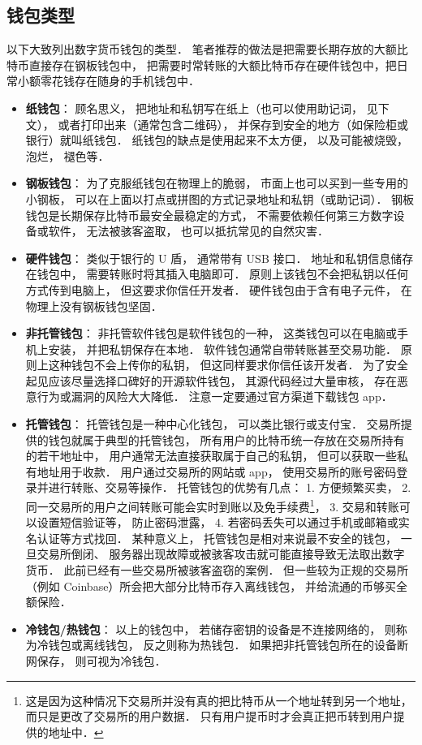 \subsection{钱包类型}
以下大致列出数字货币钱包的类型． 笔者推荐的做法是把需要长期存放的大额比特币直接存在钢板钱包中， 把需要时常转账的大额比特币存在硬件钱包中，把日常小额零花钱存在随身的手机钱包中．
\begin{itemize}
\item \textbf{纸钱包}： 顾名思义， 把地址和私钥写在纸上（也可以使用助记词， 见下文）， 或者打印出来（通常包含二维码）， 并保存到安全的地方（如保险柜或银行）就叫纸钱包． 纸钱包的缺点是使用起来不太方便， 以及可能被烧毁， 泡烂， 褪色等．
\item \textbf{钢板钱包}： 为了克服纸钱包在物理上的脆弱， 市面上也可以买到一些专用的小钢板， 可以在上面以打点或拼图的方式记录地址和私钥（或助记词）． 钢板钱包是长期保存比特币最安全最稳定的方式， 不需要依赖任何第三方数字设备或软件， 无法被骇客盗取， 也可以抵抗常见的自然灾害．
\item \textbf{硬件钱包}： 类似于银行的 U 盾， 通常带有 USB 接口． 地址和私钥信息储存在钱包中， 需要转账时将其插入电脑即可． 原则上该钱包不会把私钥以任何方式传到电脑上， 但这要求你信任开发者． 硬件钱包由于含有电子元件， 在物理上没有钢板钱包坚固．
\item \textbf{非托管钱包}： 非托管软件钱包是软件钱包的一种， 这类钱包可以在电脑或手机上安装， 并把私钥保存在本地． 软件钱包通常自带转账甚至交易功能． 原则上这种钱包不会上传你的私钥， 但这同样要求你信任该开发者． 为了安全起见应该尽量选择口碑好的开源软件钱包， 其源代码经过大量审核， 存在恶意行为或漏洞的风险大大降低． 注意一定要通过官方渠道下载钱包 app．
\item \textbf{托管钱包}： 托管钱包是一种中心化钱包， 可以类比银行或支付宝． 交易所提供的钱包就属于典型的托管钱包， 所有用户的比特币统一存放在交易所持有的若干地址中， 用户通常无法直接获取属于自己的私钥， 但可以获取一些私有地址用于收款． 用户通过交易所的网站或 app， 使用交易所的账号密码登录并进行转账、交易等操作． 托管钱包的优势有几点： 1. 方便频繁买卖， 2. 同一交易所的用户之间转账可能会实时到账以及免手续费\footnote{这是因为这种情况下交易所并没有真的把比特币从一个地址转到另一个地址， 而只是更改了交易所的用户数据． 只有用户提币时才会真正把币转到用户提供的地址中．}， 3. 交易和转账可以设置短信验证等， 防止密码泄露， 4. 若密码丢失可以通过手机或邮箱或实名认证等方式找回． 某种意义上， 托管钱包是相对来说最不安全的钱包， 一旦交易所倒闭、 服务器出现故障或被骇客攻击就可能直接导致无法取出数字货币． 此前已经有一些交易所被骇客盗窃的案例． 但一些较为正规的交易所（例如 Coinbase）所会把大部分比特币存入离线钱包， 并给流通的币够买全额保险．
\item \textbf{冷钱包/热钱包}： 以上的钱包中， 若储存密钥的设备是不连接网络的， 则称为冷钱包或离线钱包， 反之则称为热钱包． 如果把非托管钱包所在的设备断网保存， 则可视为冷钱包．
\end{itemize}

